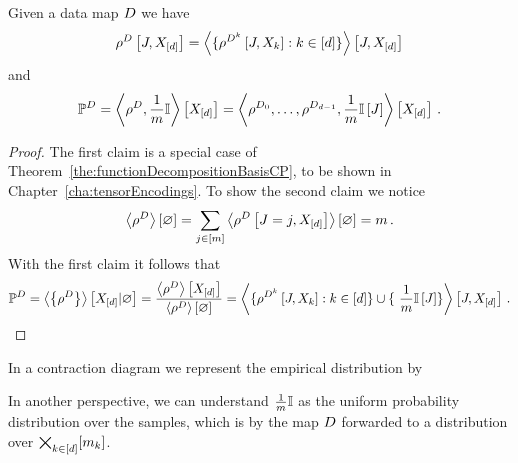 \begin{theorem}\label{the:empCPRep}
	Given a data map $D$ we have
	\begin{align*}
		\rho^{D}\left[J,X_{[d]}\right]  
		= \left\langle 
		\{\rho^{D^{k}}\left[J,X_{k}\right] : k\in[d] \} 
		\right\rangle \left[ J,X_{[d]} \right] 
	\end{align*}
	and
	\begin{align*}
	\mathbb{P}^{D} = \left\langle \rho^{D}, \frac{1}{m}\mathbb{I}\right\rangle \left[ X_{[d]} \right] 
	= \left\langle \rho^{D_{0}},\ldots,\rho^{D_{d-1}}, \frac{1}{m}\mathbb{I}\left[J\right]\right\rangle \left[ X_{[d]} \right] \, . 
	\end{align*}
\end{theorem}
\begin{proof}
	The first claim is a special case of Theorem~\ref{the:functionDecompositionBasisCP}, to be shown in Chapter~\ref{cha:tensorEncodings}.
	To show the second claim we notice
		\[ \left\langle \rho^{D}\right\rangle \left[ \varnothing \right] = \sum_{j\in[m]} \left\langle \rho^{D}\left[J=j,X_{[d]}\right]\right\rangle \left[ \varnothing \right] = m \,  . \]
	With the first claim it follows that
	\begin{align*}
		\empdistribution 
		 = \sbnormationof{\datacore}{\shortcatvariables}
		 = \frac{\sbcontractionof{\datacore}{\shortcatvariables}}{\sbcontraction{\datacore}} 
		 =  \contractionof{
		\{\rencodingofat{\datamap^{\atomenumerator}}{\datvariable,\catvariableof{\atomenumerator}} : \atomenumeratorin \} \cup \{ \frac{1}{\datanum} \onesat{\datvariable} \}
		}{\datvariable,\shortcatvariables}  \, . 
	\end{align*}
\end{proof}

In a contraction diagram we represent the empirical distribution by
\begin{center}
	
\end{center}

In another perspective, we can understand $\frac{1}{m}\mathbb{I}$ as the uniform probability distribution over the samples, which is by the map $D$ forwarded to a distribution over $\bigtimes_{k\in[d]}[m_{k}]$.















